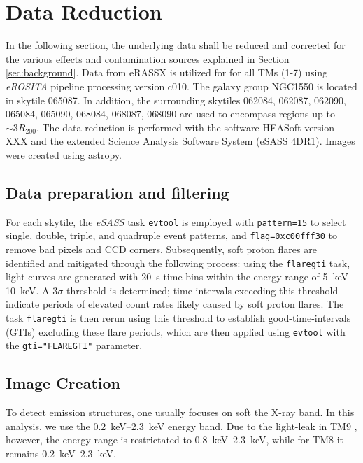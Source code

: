 
\chapter{Data Reduction}
\label{sec:data_reduction}
In the following section, the underlying data shall be reduced and corrected for the various effects and contamination sources explained in Section \ref{sec:background}. Data from eRASSX is utilized for for all TMs (1-7) using \textit{eROSITA} pipeline processing version c010. The galaxy group NGC1550 is located in skytile 065087. In addition, the surrounding skytiles 062084, 062087, 062090, 065084, 065090, 068084, 068087, 068090 are used to encompass regions up to \(\sim 3R_{200}\). The data reduction is performed with the software HEASoft version XXX and the extended Science Analysis Software System (eSASS 4DR1). Images were created using astropy.
\section{Data preparation and filtering}
For each skytile, the \textit{eSASS} task \texttt{evtool} is employed with \texttt{pattern=15} to select single, double, triple, and quadruple event patterns, and \texttt{flag=0xc00fff30} to remove bad pixels and CCD corners. Subsequently, soft proton flares are identified and mitigated through the following process: using the \texttt{flaregti} task, light curves are generated with \SI{20}{\second} time bins within the energy range of \SIrange{5}{10}{\kilo\electronvolt}. A \(3\sigma\) threshold is determined; time intervals exceeding this threshold indicate periods of elevated count rates likely caused by soft proton flares. The task \texttt{flaregti} is then rerun using this threshold to establish good-time-intervals (GTIs) excluding these flare periods, which are then applied using \texttt{evtool} with the \texttt{gti="FLAREGTI"} parameter. 
\section{Image Creation}
To detect emission structures, one usually focuses on soft the X-ray band. In this analysis, we use the \SIrange{0.2}{2.3}{\kilo\electronvolt} energy band. Due to the light-leak in TM9 , however, the energy range is restrictated to \SIrange{0.8}{2.3}{\kilo\electronvolt}, while for TM8 it remains \SIrange{0.2}{2.3}{\kilo\electronvolt}.











